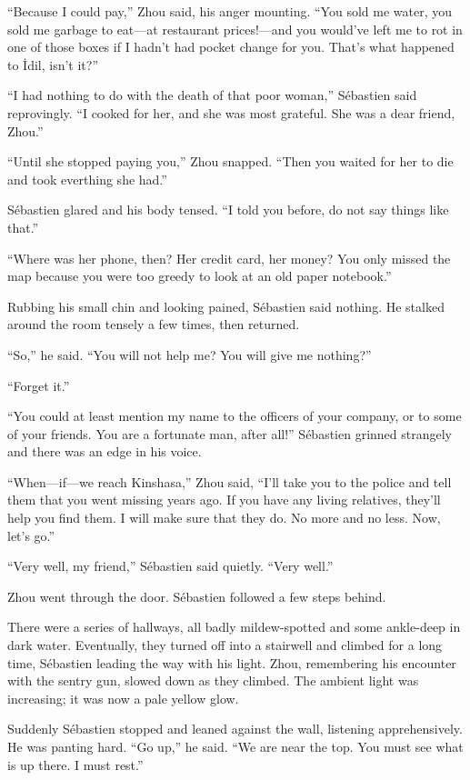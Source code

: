 \documentclass[10pt,a4paper]{article}
\begin{document}
``Because I could pay,'' Zhou said, his anger mounting. ``You sold
me water, you sold me garbage to eat---at restaurant prices!---and
you would've left me to rot in one of those boxes if I hadn't had
pocket change for you. That's what happened to \.{I}dil, isn't it?''

``I had nothing to do with the death of that poor woman,'' S\'{e}bastien
said reprovingly. ``I cooked for her, and she was most grateful. She
was a dear friend, Zhou.''

``Until she stopped paying you,'' Zhou snapped. ``Then you waited for
her to die and took everthing she had.''

S\'{e}bastien glared and his body tensed. ``I told you before, do not
say things like that.''

``Where was her phone, then? Her credit card, her money? You only
missed the map because you were too greedy to look at an old paper
notebook.''

Rubbing his small chin and looking pained, S\'{e}bastien said nothing.
He stalked around the room tensely a few times, then returned.

``So,'' he said. ``You will not help me? You will give me nothing?''

``Forget it.''

``You could at least mention my name to the officers of your company,
or to some of your friends. You are a fortunate man, after all!''
S\'{e}bastien grinned strangely and there was an edge in his voice.

``When---if---we reach Kinshasa,'' Zhou said, ``I'll take you to the
police and tell them that you went missing years ago. If you have
any living relatives, they'll help you find them. I will make sure
that they do. No more and no less. Now, let's go.''

``Very well, my friend,'' S\'{e}bastien said quietly. ``Very well.''

Zhou went through the door. S\'{e}bastien followed a few steps behind.

There were a series of hallways, all badly mildew-spotted and
some ankle-deep in dark water. Eventually, they turned off into a
stairwell and climbed for a long time, S\'{e}bastien leading the way
with his light. Zhou, remembering his encounter with the sentry
gun, slowed down as they climbed. The ambient light was increasing;
it was now a pale yellow glow.

Suddenly S\'{e}bastien stopped and leaned against the wall, listening
apprehensively. He was panting hard. ``Go up,'' he said. ``We are near
the top. You must see what is up there. I must rest.''
\end{document}
